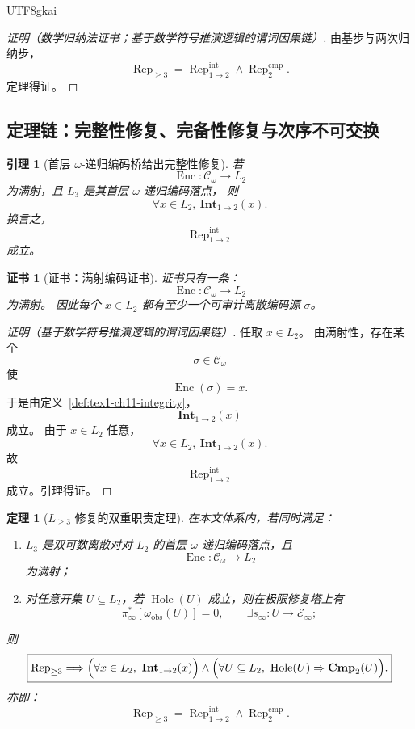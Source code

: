 \documentclass[12pt]{article}
\newtheorem{theorem}{定理}[section]
\newtheorem{lemma}{引理}[section]
\newtheorem{Certificate}{证书}[section]
\newcommand{\Hole}{\operatorname{Hole}}
\begin{document}
\begin{CJK*}{UTF8}{gkai}
\begin{proof}[证明（数学归纳法证书；基于数学符号推演逻辑的谓词因果链）]
由基步与两次归纳步，
\[
  \operatorname{Rep}_{\ge3}
  =
  \operatorname{Rep}^{\mathrm{int}}_{1\to2}
  \wedge
  \operatorname{Rep}^{\mathrm{cmp}}_{2}.
\]
定理得证。
\end{proof}

\subsection{定理链：完整性修复、完备性修复与次序不可交换}
\label{subsec:tex1-ch11-theorems}

\begin{lemma}[首层 \(\omega\)-递归编码桥给出完整性修复]
\label{lem:tex1-ch11-integrity}
若
\[
  \operatorname{Enc}:\mathcal C_\omega\to L_2
\]
为满射，且 \(L_3\) 是其首层 \(\omega\)-递归编码落点，
则
\[
  \forall x\in L_2,\ \mathbf{Int}_{1\to2}(x).
\]
换言之，
\[
  \operatorname{Rep}^{\mathrm{int}}_{1\to2}
\]
成立。
\end{lemma}

\begin{Certificate}[证书：满射编码证书]
\label{cert:tex1-ch11-integrity}
证书只有一条：
\[
  \operatorname{Enc}:\mathcal C_\omega\to L_2
\]
为满射。
因此每个 \(x\in L_2\) 都有至少一个可审计离散编码源 \(\sigma\)。
\end{Certificate}

\begin{proof}[证明（基于数学符号推演逻辑的谓词因果链）]
任取 \(x\in L_2\)。
由满射性，存在某个
\[
  \sigma\in\mathcal C_\omega
\]
使
\[
  \operatorname{Enc}(\sigma)=x.
\]
于是由定义~\ref{def:tex1-ch11-integrity}，
\[
  \mathbf{Int}_{1\to2}(x)
\]
成立。
由于 \(x\in L_2\) 任意，
\[
  \forall x\in L_2,\ \mathbf{Int}_{1\to2}(x).
\]
故
\[
  \operatorname{Rep}^{\mathrm{int}}_{1\to2}
\]
成立。引理得证。
\end{proof}

\begin{theorem}[\(L_{\ge3}\) 修复的双重职责定理]
\label{thm:tex1-ch11-dual}
在本文体系内，若同时满足：
\begin{enumerate}
  \item \(L_3\) 是双可数离散对对 \(L_2\) 的首层 \(\omega\)-递归编码落点，且
  \[
    \operatorname{Enc}:\mathcal C_\omega\to L_2
  \]
  为满射；
  \item 对任意开集 \(U\subseteq L_2\)，若 \(\Hole(U)\) 成立，则在极限修复塔上有
  \[
    \pi_\infty^\ast[\omega_{\mathrm{obs}}(U)]=0,
    \qquad
    \exists s_\infty:U\to\mathcal E_\infty;
  \]
\end{enumerate}
则
\[
  \boxed{
    \operatorname{Rep}_{\ge3}
    \Longrightarrow
    \Bigl(\forall x\in L_2,\ \mathbf{Int}_{1\to2}(x)\Bigr)
    \wedge
    \Bigl(\forall U\subseteq L_2,\ \Hole(U)\Rightarrow \mathbf{Cmp}_{2}(U)\Bigr).
  }
\]
亦即：
\[
  \boxed{
    \operatorname{Rep}_{\ge3}
    =
    \operatorname{Rep}^{\mathrm{int}}_{1\to2}
    \wedge
    \operatorname{Rep}^{\mathrm{cmp}}_{2}.
  }
\]
\end{theorem}


\end{CJK*}
\end{document}

